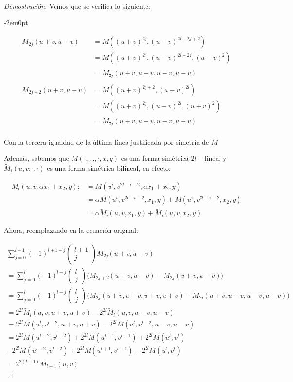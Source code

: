 \begin{proof}[Demostración]
	Vemos que se verifica lo siguiente:
	\begin{adjustwidth}{-2em}{0pt}
		\begin{center}
			\begin{align*}
				M_{2j}(u+v,u-v) &= M((u+v)^{2j},(u-v)^{2l-2j+2})\\
				&=M((u+v)^{2j},(u-v)^{2l-2j},(u-v)^2)\\
				&= \tilde{M}_{2j}(u+v,u-v,u-v,u-v) \\ \\
				M_{2j+2}(u+v,u-v) &= M((u+v)^{2j+2},(u-v)^{2l})\\
				&=M((u+v)^{2j},(u-v)^{2l},(u+v)^2) \\
				&= \tilde{M}_{2j}(u+v,u-v,u+v,u+v) \\
			\end{align*}
		\end{center}
	\end{adjustwidth}
	
	Con la tercera igualdad de la última línea justificada por simetría de $M$
	
	Además, sabemos que $M(\cdot,\dots,\cdot, x,y)$ es una forma simétrica $2l-$lineal y $\tilde{M}_i(u,v;\cdot,\cdot)$ es una forma simétrica bilineal, en efecto:
	
	
	\begin{align*}
		\tilde{M}_i(u,v,\alpha x_1 + x_2,y) :&= M(u^i,v^{2l-i-2},\alpha x_1 + x_2,y) \\
		&= \alpha  M(u^i,v^{2l-i-2}, x_1 ,y)+ M(u^i,v^{2l-i-2},x_2,y) \\
		&=\alpha \tilde{M}_i(u,v,x_1,y)+\tilde{M}_i(u,v,x_2,y)
	\end{align*}
	
	Ahora, reemplazando en la ecuación original:
	
	\begin{align*}
		\sum_{j = 0}^{l+1} (-1)^{l+1-j} \begin{pmatrix}
			l+1\\
			j
		\end{pmatrix} M_{2j}(u+v,u-v) \\
		=  \sum_{j = 0}^l (-1)^{l-j} \begin{pmatrix}
			l\\
			j
		\end{pmatrix} \bigg(M_{2j+2}(u+v,u-v)-M_{2j}(u+v,u-v) \bigg)  \\
		=  \sum_{j = 0}^l (-1)^{l-j} \begin{pmatrix}
			l\\
			j
		\end{pmatrix} \bigg(\tilde{M}_{2j}(u+v,u-v,u+v,u+v)-\tilde{M}_{2j}(u+v,u-v,u-v,u-v) \bigg)  \\
		=  2^{2l} \tilde{M}_{l}(u,v,u+v,u+v) -2^{2l}\tilde{M}_{l}(u,v,u-v,u-v)\\
		=  2^{2l} M(u^l,v^{l-2},u+v,u+v) -2^{2l}M(u^l,v^{l-2},u-v,u-v)\\
		=  2^{2l} M(u^{l+2},v^{l-2})+2^{2l} M(u^{l+1},v^{l-1})+2^{2l} M(u^{l},v^{l}) \\ -2^{2l}M(u^{l+2},v^{l-2})+2^{2l}M(u^{l+1},v^{l-1})-2^{2l}M(u^{l},v^{l})\\
		= 2^{2(l+1)}M_{l+1}(u,v) 
	\end{align*}
	

\end{proof}
